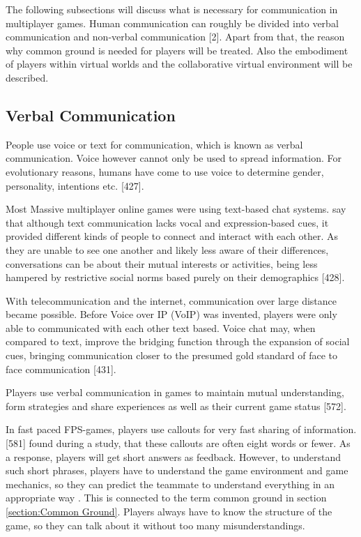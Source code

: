 The following subsections will discuss what is necessary for communication in multiplayer games.
Human communication can roughly be divided into verbal communication and non-verbal communication \autocite{Kujanpaa2003SupportingAvatars}[2]. 
Apart from that, the reason why common ground is needed for players will be treated. Also the embodiment of players within virtual worlds and the collaborative virtual environment will be described.



\subsection{Verbal Communication}
\label{section:Verbal Communication}

People use voice or text for communication, which is known as verbal communication.
Voice however cannot only be used to spread information.
For evolutionary reasons, humans have come to use voice to determine gender, personality, intentions etc. \autocite{Williams2007CanCommunity}[427].

Most Massive multiplayer online games were using text-based chat systems.
\textcite{Williams2007CanCommunity} say that although text communication lacks vocal and expression-based cues, it provided different kinds of people to connect and interact with each other. As they are unable to see one another and likely less aware of their differences, conversations can be about their mutual interests or activities, being less hampered by restrictive social norms based purely on their demographics \autocite{Williams2007CanCommunity}[428].

With telecommunication and the internet, communication over large distance became possible. Before Voice over IP (VoIP) was invented, players were only able to communicated with each other text based. Voice chat may, when compared to text, improve the bridging function through the expansion of social cues, bringing communication closer to the presumed gold standard of face to face communication \autocite{Williams2007CanCommunity}[431].

Players use verbal communication in games to maintain mutual understanding, form strategies and share experiences as well as their current game status \autocite{Cheung2012CommunicationGaming}[572].

In fast paced FPS-games, players use callouts for very fast sharing of information. \textcite{Tang2012VerbalGames}[581] found during a study, that these callouts are often eight words or fewer. As a response, players will get short answers as feedback.
However, to understand such short phrases, players have to understand the game environment and game mechanics, so they can predict the teammate to understand everything in an appropriate way \autocite{Tang2012VerbalGames}. This is connected to the term common ground in section \ref{section:Common Ground}. Players always have to know the structure of the game, so they can talk about it without too many misunderstandings.

